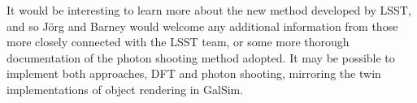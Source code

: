 \documentclass[preprint]{aastex}
\newcommand{\galsim}{{\sc GalSim}}
\begin{document}
It would be interesting to learn more about the new method developed
by LSST, and so J\"{o}rg and Barney would welcome any additional
information from those more closely connected with the LSST team, or some
more thorough documentation of the photon shooting method adopted.  It
may be possible to implement both approaches, DFT and photon shooting,
mirroring the twin implementations of object rendering in \galsim.
\end{document}
